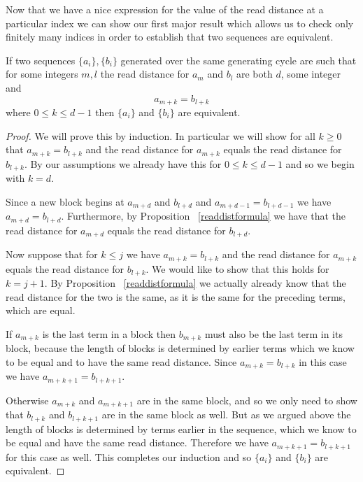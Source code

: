 \documentclass[runningheads,a4paper]{llncs}
\begin{document}
Now that we have a nice expression for the value of the read distance at a particular index we can show our first major result which allows us to check only finitely many indices in order to establish that two sequences are equivalent. 
\begin{theorem} 
\label{equivsuff}
If two sequences $\{a_i\}, \{b_i\}$ generated over the same generating cycle are such that for some integers $m,l$ the read distance for $a_m$ and $b_l$ are both $d$, some integer and 
\begin{equation*}
a_{m+k} = b_{l+k}
\end{equation*}
where $0 \leq k \leq d-1$ then $\{a_i\}$ and $\{b_i\}$ are equivalent. 
\end{theorem}
\begin{proof}
We will prove this by  induction. In particular we will show for all $k \geq 0$ that $a_{m+k} = b_{l+k}$ and the read distance for $a_{m+k}$ equals the read distance for $b_{l+k}$. By our assumptions we already have this for $0 \leq k \leq d-1$ and so we begin with $k=d$.

Since a new block begins at $a_{m+d}$ and $b_{l+d}$ and $a_{m+d-1} = b_{l+d-1}$ we have $a_{m+d} = b_{l+d}$. Furthermore, by Proposition ~\ref{readdistformula} we have that the read distance for $a_{m+d}$ equals the read distance for $b_{l+d}$. 

Now suppose that  for $k \leq j$ we have $a_{m+k} = b_{l+k}$ and the read distance for $a_{m+k}$ equals the read distance for $b_{l+k}$. We would like to show that this holds for $k = j+1$. By Proposition ~\ref{readdistformula} we actually already know that the read distance for the two is the same, as it is the same for the preceding terms, which are equal.

If $a_{m+k}$ is the last term in a block then $b_{m+k}$ must also be the last term in its block, because the length of blocks is determined by earlier terms which we know to be equal and to have the same read distance. Since $a_{m+k} = b_{l+k}$  in this case we have $a_{m+k+1} = b_{l+k+1}$. 

Otherwise $a_{m+k}$ and $a_{m+k+1}$ are in the same block, and so we only need to show that $b_{l+k}$ and $b_{l+k+1}$ are in the same block as well. But as we argued above the length of blocks is determined by terms earlier in the sequence, which we know to be equal and have the same read distance. Therefore we have $a_{m+k+1} = b_{l+k+1}$ for this case as well. This completes our induction and so $\{a_i\}$ and $\{b_i\}$ are equivalent. 
\end{proof}
\end{document}
